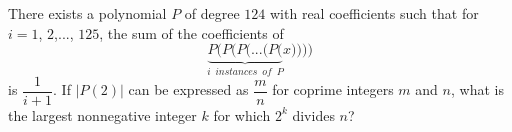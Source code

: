 There exists a polynomial $P$ of degree $124$ with real coefficients such that for $i = 1$, $2$,$...$, $125$, the sum of the coefficients of \[\underbrace{P(P(P(... (P(}_{i\,\,\, instances \,\,\, of \,\,\,P}x))))\]is $\dfrac{1}{i+1}$. If $|P(2)|$ can be expressed as $\dfrac{m}{n}$ for coprime integers $m$ and $n$, what is the largest nonnegative integer $k$ for which $2^k$ divides $n$?
